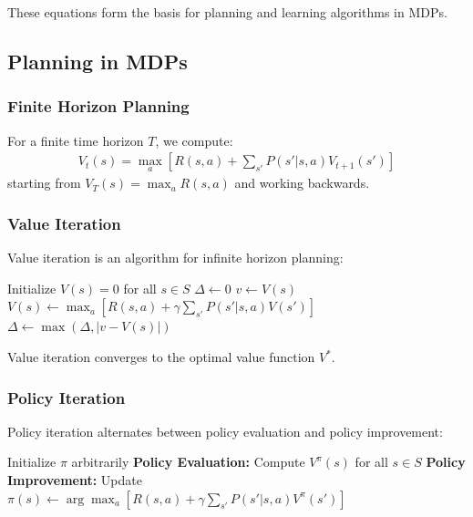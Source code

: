 \documentclass{article}
\begin{document}
These equations form the basis for planning and learning algorithms in MDPs.

\subsection{Planning in MDPs}
\subsubsection{Finite Horizon Planning}
For a finite time horizon $T$, we compute:
\begin{align}
V_t(s) = \max_a\left[R(s, a) + \sum_{s'}P(s'|s, a)V_{t+1}(s')\right]
\end{align}
starting from $V_T(s) = \max_a R(s, a)$ and working backwards.

\subsubsection{Value Iteration}
Value iteration is an algorithm for infinite horizon planning:
\begin{algorithm}
\caption{Value Iteration}
\begin{algorithmic}[1]
\State Initialize $V(s) = 0$ for all $s \in S$
\Repeat
\State $\Delta \leftarrow 0$
\State $v \leftarrow V(s)$
\State $V(s) \leftarrow \max_a\left[R(s, a) + \gamma\sum_{s'}P(s'|s, a)V(s')\right]$
\State $\Delta \leftarrow \max(\Delta, |v - V(s)|)$
\EndFor
{}
\end{algorithmic}
\end{algorithm}

Value iteration converges to the optimal value function $V^*$.

\subsubsection{Policy Iteration}
Policy iteration alternates between policy evaluation and policy improvement:
\begin{algorithm}
\caption{Policy Iteration}
\begin{algorithmic}[1]
\State Initialize $\pi$ arbitrarily
\Repeat
\State \textbf{Policy Evaluation:} Compute $V^\pi(s)$ for all $s \in S$
\State \textbf{Policy Improvement:} Update $\pi(s) \leftarrow \arg\max_a\left[R(s, a) + \gamma\sum_{s'}P(s'|s, a)V^\pi(s')\right]$
\end{algorithmic}
\end{algorithm}
\end{document}
